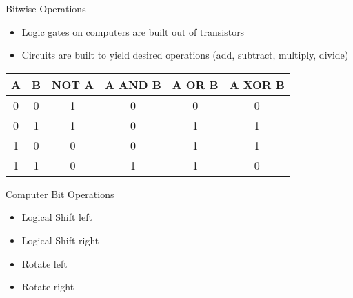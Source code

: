 \begin{withoutheadline}
\begin{frame}[fragile]{Bitwise Operations}
\begin{itemize}
    \item Logic gates on computers are built out of transistors
    \item Circuits are built to yield desired operations (add, subtract, multiply, divide)
\end{itemize}
\begin{tabular}{c|c|c|c|c|c}    \toprule
    A & B & NOT A & A AND B & A OR B & A XOR B \\ \midrule
    0 & 0 &     1 &       0 &      0 &       0 \\ 
    0 & 1 &     1 &       0 &      1 &       1 \\ 
    1 & 0 &     0 &       0 &      1 &       1 \\ 
    1 & 1 &     0 &       1 &      1 &       0 \\ \bottomrule
\end{tabular}
\end{frame}


\begin{frame}{Computer Bit Operations}
\begin{itemize}
    \item Logical Shift left
    \item Logical Shift right
    \item Rotate left
    \item Rotate right
\end{itemize}
\end{frame}

\end{withoutheadline}
 
